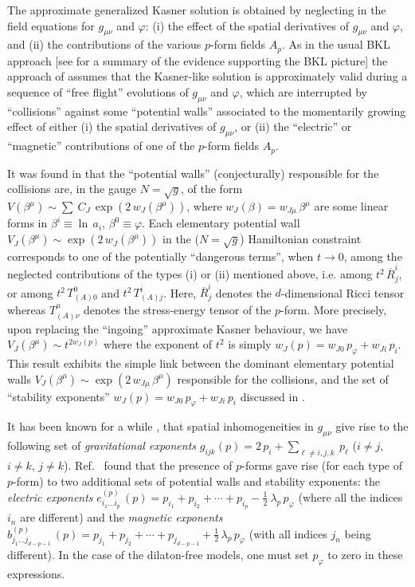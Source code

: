 \documentclass[a4paper,12pt]{article}
\begin{document}
The approximate generalized Kasner solution is obtained by neglecting 
in the field equations for $g_{\mu \nu}$ and $\varphi$: (i) the 
effect of the spatial derivatives of $g_{\mu \nu}$ and $\varphi$, and (ii) 
the contributions of the various $p$-form fields $A_p$.
As in the usual BKL approach [see \cite{bgimw} for a summary of the 
evidence supporting the BKL picture] the approach of 
\cite{dh1,dh2} assumes that the Kasner-like solution 
is approximately valid during a sequence of ``free 
flight'' evolutions of $g_{\mu \nu}$ and $\varphi$, which are 
interrupted by ``collisions'' against some ``potential walls'' 
associated to the momentarily growing effect of either (i) the 
spatial derivatives of $g_{\mu \nu}$, or (ii) the ``electric'' or 
``magnetic'' contributions of one of the $p$-form fields $A_p$. 

It was found in
\cite{dh1,dh2} that the ``potential walls'' (conjecturally)
responsible for the collisions are, in the gauge $N = \sqrt g$, of
the form $V (\beta^{\mu}) \sim \sum \ C_J \, \exp
(2 \, w_J (\beta^{\mu}))$, where $w_J (\beta) = w_{J \mu} \,
\beta^{\mu}$ are some linear forms in $\beta^i \equiv \ln \, a_i$,
$\beta^0 \equiv \varphi$. Each elementary potential wall $V_J
(\beta^{\mu}) \sim \exp (2 \, w_J (\beta^{\mu}))$ in the ($N = \sqrt g$)
Hamiltonian constraint corresponds to one of the potentially
``dangerous terms'', when $t \rightarrow 0$, among the neglected
contributions of the types (i) or (ii) mentioned above, i.e. among
$t^2 \, \overline{R}_j^i$, or among $t^2 \, T_{(A)0}^0$ and $t^2
\, T_{(A)j}^i$.  Here, $\overline{R}_j^i$ denotes the
$d$-dimensional Ricci tensor whereas
$T_{(A)\nu}^{\mu}$ denotes the stress-energy
tensor of the $p$-form. More precisely, upon replacing the
``ingoing'' approximate Kasner behaviour, we have $V_J
(\beta^{\mu}) \sim t^{2 w_J (p)}$ where the exponent of $t^2$ is
simply $w_J (p) = w_{J 0} \, p_{\varphi} + w_{J i} \, p_i$. This
result exhibits the simple link between the dominant elementary
potential walls $V_J (\beta^{\mu}) \sim \exp (2 \, w_{J \mu} \,
\beta^{\mu})$ responsible for the collisions, and the set of
``stability exponents'' $w_J (p) = w_{J 0} \, p_{\varphi} + w_{J i}
\, p_i$ discussed in \cite{dh1}. 

It has been known for a while
\cite{BKL}, \cite{DHS} that spatial inhomogeneities in $g_{\mu \nu}$
give rise to the following set of {\it gravitational exponents} 
$g_{ijk} (p) = 2 \, p_i + \sum_{\ell \ne i,j,k} \ p_{\ell}$ 
($i \ne j$, $i \ne k$, $j \ne k$). 
Ref.~\cite{dh1} found that the presence of $p$-forms gave rise (for 
each type of $p$-form) to two additional sets of potential walls
and stability 
exponents: the {\it electric exponents}
$e_{i_1 \ldots i_p}^{(p)} \, (p) = p_{i_1} + p_{i_2} + \cdots + 
p_{i_p} - \frac{1}{2} \ \lambda_p \, p_{\varphi} $
(where all the indices $i_n$ are different) and the {\it magnetic 
exponents}
$b_{j_1 \ldots j_{d-p-1}}^{(p)} \, (p) = p_{j_1} + p_{j_2} + \cdots + 
p_{j_{d-p-1}} + \frac{1}{2} \, \lambda_p \, p_{\varphi}$ 
(with all indices $j_n$ being different). In the case of the 
dilaton-free models,
one must set $p_{\varphi}$ to zero 
in these expressions.
\end{document}
